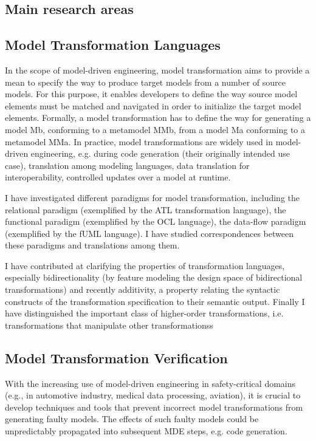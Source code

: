 \subsection*{Main research areas}

\subsection*{Model Transformation Languages}
In the scope of model-driven engineering, model transformation aims to provide a mean to specify the way to produce target models from a number of source models. For this purpose, it enables developers to define the way source model elements must be matched and navigated in order to initialize the target model elements. Formally, a model transformation has to define the way for generating a model Mb, conforming to a metamodel MMb, from a model Ma conforming to a metamodel MMa. In practice, model transformations are widely used in model-driven engineering, e.g. during code generation (their originally intended use case), translation among modeling languages, data translation for interoperability, controlled updates over a model at runtime.

I have investigated different paradigms for model transformation, including the relational paradigm (exemplified by the ATL transformation language), the functional paradigm (exemplified by the OCL language), the data-flow paradigm (exemplified by the fUML language). I have studied correspondences between these paradigms and translations among them. 

I have contributed at clarifying the properties of transformation languages, especially bidirectionality (by feature modeling the design space of bidirectional transformations) and recently additivity, a property relating the syntactic constructs of the transformation specification to their semantic output.  
Finally I have distinguished the important class of higher-order transformations, i.e. transformations that manipulate other transformationss

\subsection*{Model Transformation Verification}

With the increasing use of model-driven engineering in safety-critical domains (e.g., in automotive industry, medical data processing, aviation), it is crucial to develop techniques and tools that prevent incorrect model transformations from generating faulty models. The effects of such faulty models could be unpredictably propagated into subsequent MDE steps, e.g. code generation.

